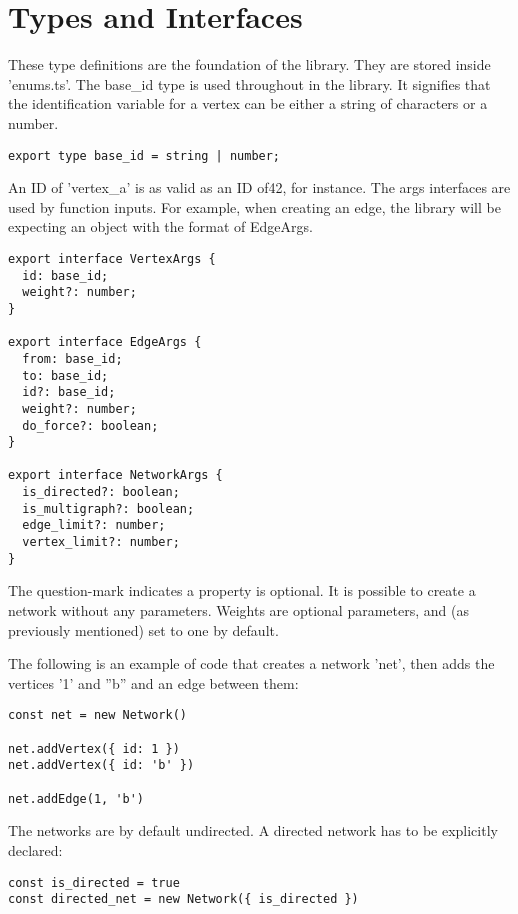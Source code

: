 \chapter{Types and Interfaces}
These type definitions are the foundation of the library. They are stored inside 'enums.ts'.
The base\_id type is used throughout in the library. It signifies that the identification variable for a vertex can be either a string of characters or a number.

\begin{verbatim}
export type base_id = string | number;
\end{verbatim}

An ID of 'vertex\_a' is as valid as an ID of42, for instance.
The args interfaces are used by function inputs. For example, when creating an edge, the library will be expecting an object with the format of EdgeArgs.

\begin{verbatim}
export interface VertexArgs {
  id: base_id;
  weight?: number;
}

export interface EdgeArgs {
  from: base_id;
  to: base_id;
  id?: base_id;
  weight?: number;
  do_force?: boolean;
}

export interface NetworkArgs {
  is_directed?: boolean;
  is_multigraph?: boolean;
  edge_limit?: number;
  vertex_limit?: number;
}
\end{verbatim}

The question-mark indicates a property is optional. It is possible to create a network without any parameters. Weights are optional parameters, and (as previously mentioned) set to one by default.

The following is an example of code that creates a network 'net', then adds the vertices '1' and ''b'' and an edge between them:

\begin{verbatim}
const net = new Network()

net.addVertex({ id: 1 })
net.addVertex({ id: 'b' })

net.addEdge(1, 'b')
\end{verbatim}

The networks are by default undirected. A directed network has to be explicitly declared:

\begin{verbatim}
const is_directed = true
const directed_net = new Network({ is_directed })
\end{verbatim}

